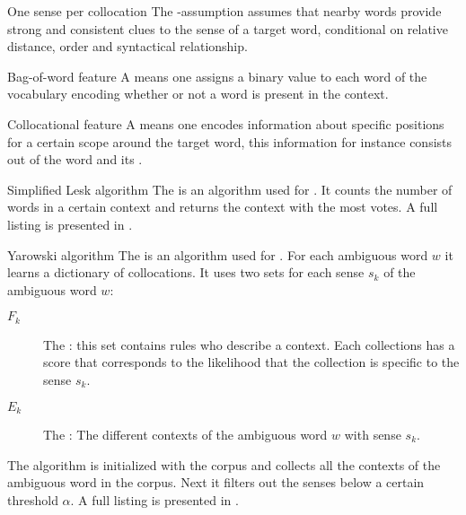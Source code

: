 \begin{tm}{One sense per collocation}
The \sb{}-assumption assumes that nearby words provide strong and consistent clues to the sense of a target word, conditional on relative distance, order and syntactical relationship.
\end{tm}
\begin{df}{Bag-of-word feature}
A \sb{} means one assigns a binary value to each word of the vocabulary encoding whether or not a word is present in the context.
\end{df}
\begin{df}{Collocational feature}
A \sb{} means one encodes information about specific positions for a certain scope around the target word, this information for instance consists out of the word and its .
\end{df}
\begin{df}{Simplified Lesk algorithm}
The \sb{} is an algorithm used for . It counts the number of words in a certain context and returns the context with the most votes. A full listing is presented in .
\end{df}
\begin{df}{Yarowski algorithm}
The \sb{} is an algorithm used for . For each ambiguous word $w$ it learns a dictionary of collocations. It uses two sets for each sense $s_k$ of the ambiguous word $w$:
\begin{description}
 \item [$F_k$] The : this set contains rules who describe a context. Each collections has a score that corresponds to the likelihood that the collection is specific to the sense $s_k$.
 \item [$E_k$] The : The different contexts of the ambiguous word $w$ with sense $s_k$.
\end{description}
The algorithm is initialized with the corpus and collects all the contexts of the ambiguous word in the corpus. Next it filters out the senses below a certain threshold $\alpha$. A full listing is presented in .
\end{df}
